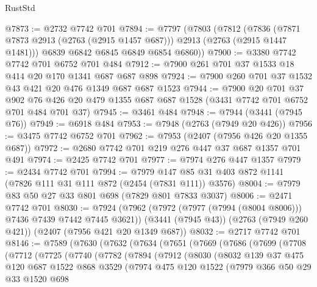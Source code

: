 \begin{lexlean}{RustStd}
\begin{coremodule}
@7873 := @2732 @7742 @701
@7894 := @7797
    (@7803
      (@7812
        (@7836 (@7871 @7873 @2913 (@2763 (@2915 @1457 @687))) @2913 (@2763 (@2915 @1447 @1481)))
        @6839
        @6842
        @6845
        @6849
        @6854
        @6860))
@7900 := @3380 @7742 @7742 @701 @6752 @701 @484
@7912 := @7900 @261 @701 @37 @1533 @18 @414 @20 @170 @1341 @687 @687 @898
@7924 := @7900 @260 @701 @37 @1532 @43 @421 @20 @476 @1349 @687 @687 @1523
@7944 := @7900
    @20
    @701
    @37
    @902
    @76
    @426
    @20
    @479
    @1355
    @687
    @687
    @1528
    (@3431 @7742 @701 @6752 @701 @484 @701 @37)
@7945 := @3461 @484
@7948 := @7944 (@3441 (@7945 @76))
@7949 := @6918 @484
@7953 := @7948 (@2763 (@7949 @20 @426))
@7956 := @3475 @7742 @6752 @701
@7962 := @7953 (@2407 (@7956 @426 @20 @1355 @687))
@7972 := @2680 @7742 @701 @219 @276 @447 @37 @687 @1357 @701 @491
@7974 := @2425 @7742 @701
@7977 := @7974 @276 @447 @1357
@7979 := @2434 @7742 @701
@7994 := @7979 @147 @85 @31 @403 @872 @1141 (@7826 @111 @31 @111 @872 (@2454 (@7831 @111)) @3576)
@8004 := @7979 @83 @50 @27 @33 @801 @698 (@7829 @801 @7833 @3037)
@8006 := @2471 @7742 @701
@8030 := @7924
    (@7962 (@7972 (@7977 (@7994 (@8004 @8006))) @7436 @7439 @7442 @7445 @3621))
    (@3441 (@7945 @43))
    (@2763 (@7949 @260 @421))
    (@2407 (@7956 @421 @20 @1349 @687))
@8032 := @2717 @7742 @701
@8146 := @7589
    (@7630
      (@7632
        (@7634
          (@7651
            (@7669
              (@7686
                (@7699
                  (@7708
                    (@7712
                      (@7725
                        (@7740
                          (@7782
                            (@7894
                              (@7912
                                (@8030
                                  (@8032
                                    @139
                                    @37
                                    @475
                                    @120
                                    @687
                                    @1522
                                    @868
                                    @3529
                                    (@7974
                                      @475
                                      @120
                                      @1522
                                      (@7979
                                        @366
                                        @50
                                        @29
                                        @33
                                        @1520
                                        @698

\end{coremodule}
\end{lexlean}
